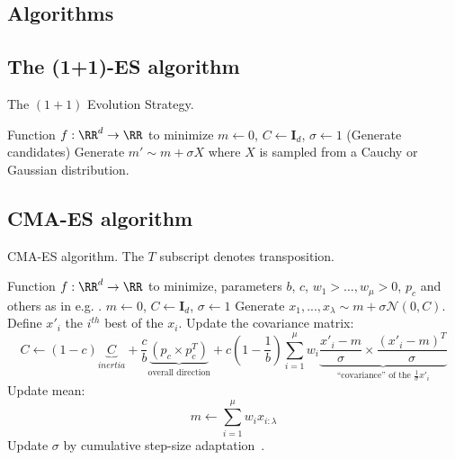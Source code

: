 \begin{subappendices}
    

\section{Algorithms}
\subsection{The (1+1)-ES algorithm}
\begin{algorithm}
\caption{\label{opo}The $(1+1)$ Evolution Strategy.}
\begin{algorithmic}
\REQUIRE Function $f:\RR^d\to\RR$ to minimize%
\STATE $m\leftarrow 0$, $C\leftarrow \boldsymbol{I}_d$, $\sigma\leftarrow 1$
\STATE (Generate candidates)
\STATE Generate $m' \sim m+\sigma X$ where $X$ is sampled from a Cauchy or Gaussian distribution.
\ELSE
{}
\ENDIF
\ENDFOR
\end{algorithmic}
\end{algorithm}

\subsection{CMA-ES algorithm}
\begin{algorithm}
\caption{\label{cmaalg}CMA-ES algorithm. The $T$ subscript denotes transposition.}
\begin{algorithmic}
\REQUIRE Function $f:\RR^d\to\RR$ to minimize, parameters $b$, $c$, $w_1>\dots,w_\mu>0$, $p_c$ and others as in e.g. \citep{HAN}.%
\STATE $m\leftarrow 0$, $C\leftarrow \boldsymbol{I}_d$, $\sigma\leftarrow 1$
\STATE Generate $x_1,...,x_\lambda \sim m + \sigma \mathcal{N}(0,C)$.
\STATE Define $x'_{i}$ the $i^{th}$ best of the $x_i$.
\STATE Update the covariance matrix:
$$C\leftarrow (1-c)\underbrace{C}_{inertia}+\frac cb \underbrace{(p_c\times p_c^T)}_{\mbox{overall direction}} +c(1-\frac 1b)\sum_{i=1}^\mu w_i\underbrace{\frac{x'_i-m}\sigma\times \frac{(x'_i-m)^T}\sigma}_{\mbox{``covariance'' of the $\frac1\sigma x'_i$}}$$
\STATE Update mean:%
$$m\leftarrow \sum_{i=1}^\mu w_i x_{i:\lambda}$$
\STATE Update $\sigma$ by cumulative step-size adaptation~\citep{csalinear}.
\ENDFOR
\end{algorithmic}
\end{algorithm}


\end{subappendices}

